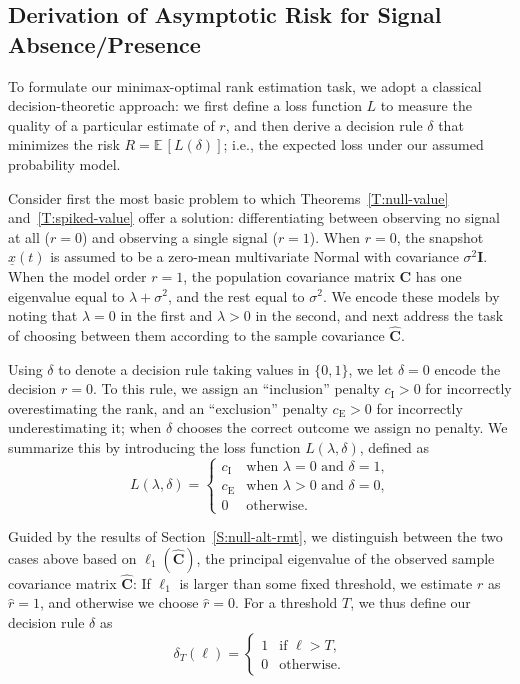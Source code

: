 \documentclass[final]{IEEEtran} %
\newcommand{\vectorsymbol}{\underline}
\newcommand{\matrixsymbol}{\boldsymbol}
\newcommand{\mC}{\matrixsymbol{C}}
\newcommand{\mhC}{\widehat{\matrixsymbol{C}}}
\newcommand{\mI}{\matrixsymbol{I}}
\newcommand{\vx}{\vectorsymbol{x}}
\newcommand{\ce}{c_\text{E}}
\newcommand{\ci}{c_\text{I}}
\newcommand{\E}{\mathbb{E}}
\begin{document}
\subsection{Derivation of Asymptotic Risk for Signal Absence/Presence}

To formulate our minimax-optimal rank estimation task, we adopt a classical decision-theoretic approach: we first define a loss function $L$ to measure the quality of a particular estimate of $r$, and then derive a decision rule $\delta$ that minimizes the risk $R = \E \, [ L(\delta) ]$; i.e., the expected loss under our assumed probability model.

Consider first the most basic problem to which Theorems~\ref{T:null-value} and~\ref{T:spiked-value} offer a solution: differentiating between observing no signal at all ($r=0$) and observing a single signal ($r=1$).  When $r=0$, the snapshot $\vx(t)$ is assumed to be a zero-mean multivariate Normal with covariance $\sigma^2 \mI$. When the model order $r=1$, the population covariance matrix $\mC$ has one eigenvalue equal to $\lambda + \sigma^2$, and the rest equal to $\sigma^2$.  We encode these models by noting that $\lambda = 0$ in the first and $\lambda > 0$ in the second, and next address the task of choosing between them according to the sample covariance $\mhC$.

Using $\delta$ to denote a decision rule taking values in $\{ 0,1 \}$, we let $\delta = 0$ encode the decision $r = 0$. To this rule, we assign an ``inclusion'' penalty $\ci > 0$ for incorrectly overestimating the rank, and an ``exclusion'' penalty $\ce > 0$ for incorrectly underestimating it; when $\delta$ chooses the correct outcome we assign no penalty. We summarize this by introducing the loss function $L(\lambda, \delta)$, defined as
\begin{equation*}
    L(\lambda, \delta)
    =
    \begin{cases}
        \ci &\text{when $\lambda = 0$ and $\delta = 1$,} \\
        \ce &\text{when $\lambda > 0$ and $\delta = 0$,} \\
        0   &\text{otherwise.}
    \end{cases}
\end{equation*}

Guided by the results of Section~\ref{S:null-alt-rmt}, we distinguish between the two cases above based on $\ell_1(\mhC)$, the principal eigenvalue of the observed sample covariance matrix $\mhC$: If $\ell_1$ is larger than some fixed threshold, we estimate $r$ as $\hat r = 1$, and otherwise we choose $\hat r = 0$.  For a threshold $T$, we thus define our decision rule $\delta$ as
\begin{equation}\label{E:delta}
    \delta_T (\ell)
    =
    \begin{cases}
        1 &\text{if $\ell > T$,} \\
        0 &\text{otherwise.}
    \end{cases}
\end{equation}
\end{document}
